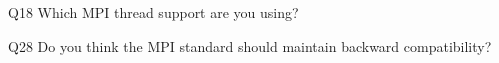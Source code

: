 \begin{description}%
\item{Q18} Which MPI thread support are you using?%
\item{Q28} Do you think the MPI standard should maintain backward compatibility?%
\end{description}%
